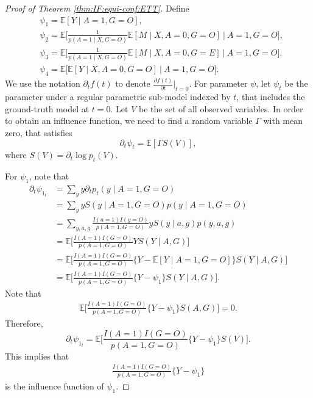\documentclass[10pt]{article}
\newcommand{\E}{\mathbb{E}}
\begin{document}
\begin{proof}[Proof of Theorem \ref{thm:IF:equi-conf:ETT}]
	
Define
\begin{align*}
&\psi_1=
\E[Y\mid A=1,G=O],\\
&\psi_2=
\E\big[\frac{1}{p(A=1\mid X,G=O)}\E[M\mid X,A=0,G=O]~\big|~ A=1,G=O\big],\\
&\psi_3=
\E\big[\frac{1}{p(A=1\mid X,G=O)}\E[M\mid X,A=0,G=E]~\big|~ A=1,G=O\big],\\
&\psi_4=
\E\big[\E[Y\mid  X,A=0,G=O]~\big|~ A=1,G=O\big].
\end{align*}
We use the notation $\partial_tf(t)$ to denote $\frac{\partial f(t)}{\partial t}\big|_{t=0}$.
For parameter $\psi$, let $\psi_t$ be the parameter under a regular parametric sub-model indexed by $t$, that includes the ground-truth model at $t=0$.
Let $V$ be the set of all observed variables.
In order to obtain an influence function, we need to find a random variable $\Gamma$ with mean zero, that satisfies
\[
\partial_t\psi_t=\E[\Gamma S(V)],
\]
where $S(V)=\partial_t\log p_t(V)$.	

For $\psi_1$, note that
\begin{align*}
\partial_t\psi_{1_t} 
&= \sum_{y} y\partial_t p_t(y\mid A=1,G=O)\\
&= \sum_{y} yS(y\mid A=1,G=O)p(y\mid A=1,G=O)\\
&= \sum_{y,a,g}\frac{I(a=1)I(g=O)}{p(A=1,G=O)} yS(y\mid a,g)p(y,a,g)\\
&= \E\Big[\frac{I(A=1)I(G=O)}{p(A=1,G=O)} YS(Y\mid A,G)\Big]\\
&= \E\Big[\frac{I(A=1)I(G=O)}{p(A=1,G=O)} \{Y-\E[Y\mid A=1,G=O]\}S(Y\mid A,G)\Big]\\
&= \E\Big[\frac{I(A=1)I(G=O)}{p(A=1,G=O)} \{Y-\psi_1\}S(Y\mid A,G)\Big].
\end{align*}
Note that
\begin{align*}
\E\Big[\frac{I(A=1)I(G=O)}{p(A=1,G=O)} \{Y-\psi_1\}S(A,G)\Big]=0.
\end{align*}
Therefore,
\begin{equation*}
\partial_t\psi_{1_t}
=\E\Big[\frac{I(A=1)I(G=O)}{p(A=1,G=O)} \{Y-\psi_1\}S(V)\Big].
\end{equation*}
This implies that 
\begin{align*}
\frac{I(A=1)I(G=O)}{p(A=1,G=O)} \{Y-\psi_1\}	
\end{align*}
is the influence function of $\psi_1$.


\end{proof}
\end{document}
